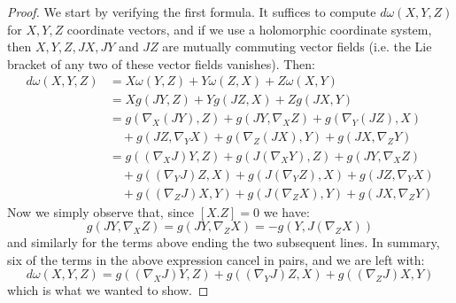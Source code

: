 \begin{proof} We start by verifying the first formula.  It suffices to compute $d \omega( X,Y,Z )$ for $X,Y,Z$ coordinate vectors, and if we use a holomorphic coordinate system, then $X,Y,Z,JX,JY$ and $JZ$ are mutually commuting vector fields (i.e. the Lie bracket of any two of these vector fields vanishes).  Then:
%
\begin{align*}
d \omega( X, Y, Z ) &= X \omega(Y,Z) + Y \omega(Z,X) + Z \omega(X,Y) \\
%
&= X g( JY, Z ) + Y g( JZ, X ) + Z g( JX, Y ) \\
%
&= g( \nabla_X (JY), Z ) + g( JY, \nabla_X Z) + g( \nabla_Y (JZ), X )\\
& \quad + g( JZ, \nabla_Y X ) + g( \nabla_Z (JX), Y ) + g( JX, \nabla_Z Y ) \\
%
&= g( (\nabla_X J)Y, Z ) + g( J( \nabla_X Y ), Z ) + g( JY, \nabla_X Z) \\
& \quad + g( (\nabla_Y J)Z, X ) + g( J( \nabla_Y Z ), X ) + g( JZ, \nabla_Y X ) \\
& \quad + g( (\nabla_Z J)X, Y ) + g( J( \nabla_Z X ), Y ) + g( JX, \nabla_Z Y )
\end{align*}
%
Now we simply observe that, since $[X.Z] = 0$ we have:
%
$$ g( JY, \nabla_X Z) = g( JY, \nabla_Z X ) = - g( Y, J( \nabla_Z X ) )$$
%
and similarly for the terms above ending the two subsequent lines.  In summary, six of the terms in the above expression cancel in pairs, and we are left with:
%
$$ d \omega( X, Y, Z ) = g( (\nabla_X J)Y, Z) + g( (\nabla_Y J)Z, X ) + g( (\nabla_Z J)X, Y ) $$
%
which is what we wanted to show.


\end{proof}
